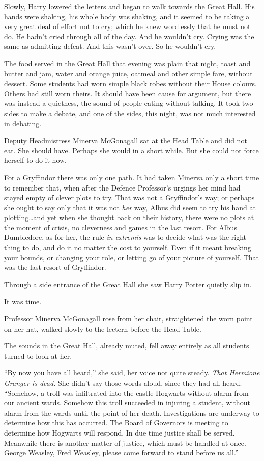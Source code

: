 Slowly, Harry lowered the letters and began to walk towards the Great Hall. His hands were shaking, his whole body was shaking, and it seemed to be taking a very great deal of effort not to cry; which he knew wordlessly that he must not do. He hadn’t cried through all of the day. And he wouldn’t cry. Crying was the same as admitting defeat. And this wasn’t over. So he wouldn’t cry.

\later

The food served in the Great Hall that evening was plain that night, toast and butter and jam, water and orange juice, oatmeal and other simple fare, without dessert. Some students had worn simple black robes without their House colours. Others had still worn theirs. It should have been cause for argument, but there was instead a quietness, the sound of people eating without talking. It took two sides to make a debate, and one of the sides, this night, was not much interested in debating.

Deputy Headmistress Minerva McGonagall sat at the Head Table and did not eat. She should have. Perhaps she would in a short while. But she could not force herself to do it now.

For a Gryffindor there was only one path. It had taken Minerva only a short time to remember that, when after the Defence Professor’s urgings her mind had stayed empty of clever plots to try. That was not a Gryffindor’s way; or perhaps she ought to say only that it was not \emph{her} way, Albus did seem to try his hand at plotting…and yet when she thought back on their history, there were no plots at the moment of crisis, no cleverness and games in the last resort. For Albus Dumbledore, as for her, the rule \emph{in extremis} was to decide what was the right thing to do, and do it no matter the cost to yourself. Even if it meant breaking your bounds, or changing your role, or letting go of your picture of yourself. That was the last resort of Gryffindor.

Through a side entrance of the Great Hall she saw Harry Potter quietly slip in.

It was time.

Professor Minerva McGonagall rose from her chair, straightened the worn point on her hat, walked slowly to the lectern before the Head Table.

The sounds in the Great Hall, already muted, fell away entirely as all students turned to look at her.

“By now you have all heard,” she said, her voice not quite steady. \emph{That Hermione Granger is dead.} She didn’t say those words aloud, since they had all heard. “Somehow, a troll was infiltrated into the castle Hogwarts without alarm from our ancient wards. Somehow this troll succeeded in injuring a student, without alarm from the wards until the point of her death. Investigations are underway to determine how this has occurred. The Board of Governors is meeting to determine how Hogwarts will respond. In due time justice shall be served. Meanwhile there is another matter of justice, which must be handled at once. George Weasley, Fred Weasley, please come forward to stand before us all.”

